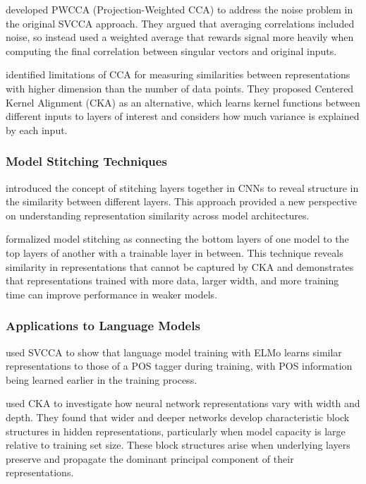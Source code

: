 \citet{morcos2018pwcca} developed PWCCA (Projection-Weighted CCA) to address the noise problem in the original SVCCA approach. They argued that averaging correlations included noise, so instead used a weighted average that rewards signal more heavily when computing the final correlation between singular vectors and original inputs.

\citet{kornblith2019cka} identified limitations of CCA for measuring similarities between representations with higher dimension than the number of data points. They proposed Centered Kernel Alignment (CKA) as an alternative, which learns kernel functions between different inputs to layers of interest and considers how much variance is explained by each input.

\subsubsection{Model Stitching Techniques}

\citet{lenc2015understanding} introduced the concept of stitching layers together in CNNs to reveal structure in the similarity between different layers. This approach provided a new perspective on understanding representation similarity across model architectures.

\citet{bansal2021stitch} formalized model stitching as connecting the bottom layers of one model to the top layers of another with a trainable layer in between. This technique reveals similarity in representations that cannot be captured by CKA and demonstrates that representations trained with more data, larger width, and more training time can improve performance in weaker models.

\subsubsection{Applications to Language Models}

\citet{saphra2019understanding} used SVCCA to show that language model training with ELMo learns similar representations to those of a POS tagger during training, with POS information being learned earlier in the training process.

\citet{nguyen2020wide} used CKA to investigate how neural network representations vary with width and depth. They found that wider and deeper networks develop characteristic block structures in hidden representations, particularly when model capacity is large relative to training set size. These block structures arise when underlying layers preserve and propagate the dominant principal component of their representations.

